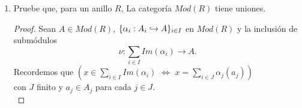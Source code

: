 \documentclass{article}
\begin{document}
\begin{enumerate}[label=\textbf{Ej \arabic*.}]
\begin{proof}
			\begin{equation*}
				u_i=\varnothing_A=inc\varnothing_U=inc\gamma_i.
			\end{equation*}
			Si ahora $A_i\neq\varnothing$, entonces
			\begin{align*}
				u_i\lrprth{a}&=inc\gamma_i\lrprth{a}, &&\forall\ a\in A_i\\
				\implies u_i&=inc\gamma_i.
			\end{align*}
		Con lo cual se ha verificado que $\forall\ i\in I$ $u_i\leq inc$. Supongamos ahora que $\catarrow{f}{A}{B}{}$ y $\catarrow{\mu}{B'}{B}{m}$ son funciones tales que cada $u_i$ es llevado a $\mu$ vía $f$, es decir para cada $i\in I$ el siguiente diagrama conmuta en $Sets$
		\begin{center}
			.
		\end{center}
	Notemos que para cada $y\in U$ $\exists\ i\in I$ y $x\in A_i$ tales que $y=u_i\lrprth{x}$, así consideremos la aplicación
	\begin{align*}
		\descapp{h}{U}{B'}{u_i\lrprth{x}}{g_i\lrprth{x}}{.}
	\end{align*}
	Sea $y\in U$ con $i,j\in I$ y $x\in A_i, z\in A_j$ tales que $u_i\lrprth{x}=y=u_j\lrprth{z}$, entonces de la conmutatividad de los diagramas anteriores se tiene que
	\begin{align*}
		\mu\lrprth{g_j\lrprth{z}}&=fu_j\lrprth{b}=f\lrprth{x}=f\lrprth{u_i\lrprth{x}}\\
		&=fu_i\lrprth{x}=\mu\lrprth{g_i\lrprth{x}}.
	\end{align*}
Lo anterior, en conjunto a que $\mu$ es inyectiva por ser un mono en $Sets$,  garantiza que $g_j\lrprth{z}=g_i\lrprth{x}$ y así $h$ está bien definida.\\
	Sea $y\in U$, con $i\in I$ y $x\in A_i$ tales que $y=u_i\lrprth{x}$. Se tiene que
	\begin{align*}
		finc\lrprth{y}&=f\lrprth{y}=f\lrprth{u_i\lrprth{x}}=\mu g_i\lrprth{x}=\mu\lrprth{h\lrprth{y}}\\
		&=\mu h\lrprth{y}\\
		\implies finc&=\mu h.
	\end{align*}
	Con lo cual $inc$ es llevado a $\mu$ vía $f$ y por tanto es una unión para la familia $\arbtfam{u}{i}{I}$.\\
		\end{proof}
		\item Pruebe que, para un anillo $R$, La categoría $Mod(R)$ tiene uniones.\\
		\begin{proof}
			Sean $A\in Mod(R)$, $\{\alpha_i \catarrow{}{A_i}{A}{m}\}_{i\in I}$ en $Mod(R)$ y la inclusión de submódulos
			\[
			\nu\colon \displaystyle \sum_{i\in I}Im(\alpha_i)\longrightarrow A.
			\]
			Recordemos que $\left(x\in \displaystyle\sum_{i\in I}Im(\alpha_i)\,\,\iff\,\, x=\sum_{i\in J}\alpha_j(a_j)\right)$ \\
			con $J$ finito y $a_j\in A_j$ para cada $j\in J$.\\
			

\end{proof}
\end{enumerate}
\end{document}
